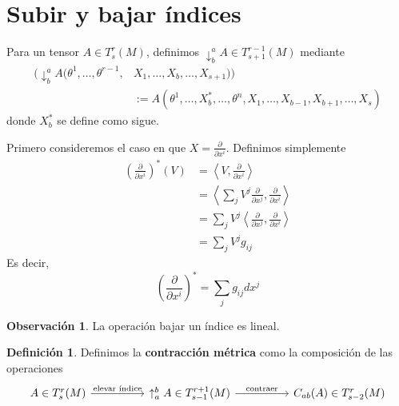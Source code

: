 \documentclass[spanish]{book}
\theoremstyle{definition}
\newtheorem*{defn}{Definición}
\newtheorem*{obs}{Observación}
\begin{document}
	\section{Subir y bajar índices}
	Para un tensor $A\in T^r_s(M)$, definimos $	\downarrow^a_bA\in T^{r-1}_{s+1}(M)$ mediante 
	\begin{align*}
		(\downarrow^a_bA(\theta^1,\ldots,\theta^{r-1},&X_1,\ldots,X_b,\ldots,X_{s+1}))\\
		&:=A(\theta^1,\ldots,X^*_b,\ldots,\theta^n,X_1,\ldots,X_{b-1},X_{b+1},\ldots,X_s)
	\end{align*}
	donde $X^*_b$ se define como sigue.
	
	Primero consideremos el caso en que $X=\frac{\partial}{\partial x^i}$. Definimos simplemente
	\begin{align*}\left(\frac{\partial}{\partial x^i}\right)^*(V)&=\left\langle V,\frac{\partial}{\partial x^i}\right\rangle\\
		&=\left\langle \sum_j V^j\frac{\partial}{\partial x^j},\frac{\partial}{\partial x^i}\right\rangle\\
		&=\sum_j V^j\left\langle \frac{\partial}{\partial x^j},\frac{\partial}{\partial x^i}\right\rangle\\
		&=\sum_jV^jg_{ij}
	\end{align*}
	Es decir,
	\[\left(\frac{\partial}{\partial x^i}\right)^*=\sum_jg_{ij}dx^j\]
	\begin{obs}
		La operación bajar un índice es lineal.
	\end{obs}
	\begin{defn}
		Definimos la \textbf{contracción métrica} como la composición de las operaciones
		\[\begin{tikzcd}[column sep=huge]
			A\in T^{r}_{s}(M)\arrow{r}{\text{elevar índice}}&\uparrow^b_aA\in T^{r+1}_{s-1}(M)\arrow{r}{\text{contraer}}& C_{ab}(A)\in T_{s-2}^r(M)
		\end{tikzcd}
		\]
	\end{defn}
\end{document}
